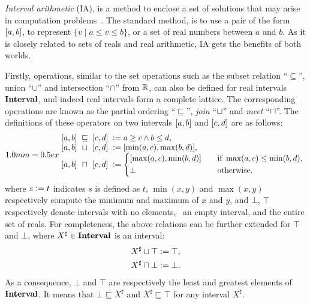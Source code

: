 \emph{Interval arithmetic} (IA), is a method to enclose a set of solutions that
may arise in computation problems~\cite{moore}.  The standard method, is to use
a pair of the form $\left[{a}, {b}\right]$, to represent $\{ v \mid a \leq v \leq b
\}$, or a set of real numbers between $a$ and $b$.  As it is closely related to
sets of reals and real arithmetic, IA gets the benefits of both worlds.

Firstly, operations, similar to the set operations such as the subset relation
``$\subseteq$'', union ``$\cup$'' and intersection ``$\cap$'' from $\mathbb{R}$,
can also be defined for real intervals $\mathbf{Interval}$, and indeed real
intervals form a complete lattice.  The corresponding operations are known
as the partial ordering ``$\sqsubseteq$'', \emph{join} ``$\sqcup$'' and
\emph{meet} ``$\sqcap$''.  The definitions of these operators on two intervals
$\left[{a}, {b}\right]$ and $\left[{c}, {d}\right]$ are as follows:
\begin{equation}
    \arraycolsep=0.5ex
    \begin{array}{lcll}
        \interval{a}{b} & \sqsubseteq & \interval{c}{d}
            &\defeq a \geq c \wedge b \leq d, \\
        \interval{a}{b} & \join & \interval{c}{d}
            &\defeq [\min(a, c), \max(b, d)], \\
        \interval{a}{b} & \meet & \interval{c}{d}
            &\defeq \left\{
                \begin{aligned}
                    & [\max(a, c), \min(b, d)] \quad &&
                        \text{if~} \max(a, c) \leq \min(b, d), \\
                    & \bot && \text{otherwise}.
                \end{aligned}
            \right.
    \end{array}\label{bg:eq:interval_relations}
\end{equation}
where $s \vcentcolon= t$ indicates $s$ is defined as $t$, $\min(x, y)$ and $\max(x,
y)$ respectively compute the minimum and maximum of $x$ and $y$, and $\bot$,
$\top$ respectively denote intervals with no elements, \ie~an empty interval,
and the entire set of reals.  For completeness, the above relations can be
further extended for $\top$ and $\bot$, where $X^\sharp \in \mathbf{Interval}$ is an
interval:
\begin{equation}
    \begin{aligned}
        X^\sharp \sqcup \top &\vcentcolon= \top, \\
        X^\sharp \sqcap \bot &\vcentcolon= \bot.
    \end{aligned}
\end{equation}
As a consequence, $\bot$ and $\top$ are respectively the least and greatest
elements of $\mathbf{Interval}$.  It means that $\bot \sqsubseteq X^\sharp$ and
$X^\sharp \sqsubseteq \top$ for any interval $X^\sharp$.

